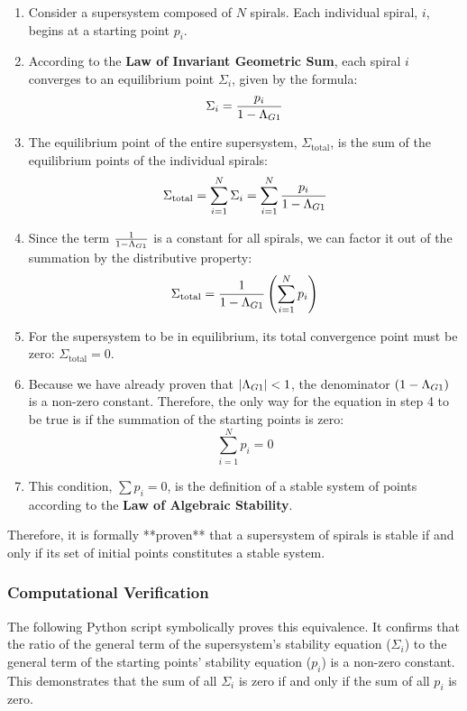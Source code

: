 \begin{enumerate}
    \item Consider a supersystem composed of $N$ spirals. Each individual spiral, $i$, begins at a starting point $p_i$.

    \item According to the \textbf{Law of Invariant Geometric Sum}, each spiral $i$ converges to an equilibrium point $\Sigma_i$, given by the formula:
    $$ \Sigma_i = \frac{p_i}{1 - \Lambda_{G1}} $$

    \item The equilibrium point of the entire supersystem, $\Sigma_{\text{total}}$, is the sum of the equilibrium points of the individual spirals:
    $$ \Sigma_{\text{total}} = \sum_{i=1}^{N} \Sigma_i = \sum_{i=1}^{N} \frac{p_i}{1 - \Lambda_{G1}} $$
    
    \item Since the term $\frac{1}{1 - \Lambda_{G1}}$ is a constant for all spirals, we can factor it out of the summation by the distributive property:
    $$ \Sigma_{\text{total}} = \frac{1}{1 - \Lambda_{G1}} \left( \sum_{i=1}^{N} p_i \right) $$

    \item For the supersystem to be in equilibrium, its total convergence point must be zero: $\Sigma_{\text{total}} = 0$.
    
    \item Because we have already proven that $|\Lambda_{G1}| < 1$, the denominator $(1 - \Lambda_{G1})$ is a non-zero constant. Therefore, the only way for the equation in step 4 to be true is if the summation of the starting points is zero:
    $$ \sum_{i=1}^{N} p_i = 0 $$

    \item This condition, $\sum p_i = 0$, is the definition of a stable system of points according to the \textbf{Law of Algebraic Stability}. 
\end{enumerate}
Therefore, it is formally **proven** that a supersystem of spirals is stable if and only if its set of initial points constitutes a stable system.

\subsubsection*{Computational Verification}
The following Python script symbolically proves this equivalence. It confirms that the ratio of the general term of the supersystem's stability equation ($\Sigma_i$) to the general term of the starting points' stability equation ($p_i$) is a non-zero constant. This demonstrates that the sum of all $\Sigma_i$ is zero if and only if the sum of all $p_i$ is zero.

